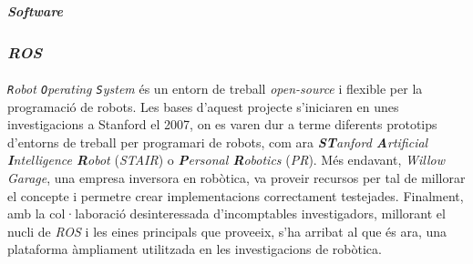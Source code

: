 \documentclass[12pt,a4paper,final,twoside]{article}
\begin{document}



\vspace{20pt}
\textbf{\textit{Software}}
\label{Software}




  


\subsubsection{\textit{ROS}}
\label{ROS}

\paragraph{}\textit{\texttt{R}obot \texttt{O}perating \texttt{S}ystem} \cite{ROS} és un entorn de treball \textit{open-source} i flexible per la programació de robots. Les bases d'aquest projecte s'iniciaren en unes investigacions a Stanford el 2007, on es varen dur a terme diferents prototips d'entorns de treball per programari de robots, com ara \textit{\textbf{ST}anford \textbf{A}rtificial \textbf{I}ntelligence \textbf{R}obot} (\textit{STAIR}) o \textit{\textbf{P}ersonal \textbf{R}obotics} (\textit{PR}). Més endavant, \textit{Willow Garage}, una empresa inversora en robòtica, va proveir recursos per tal de millorar el concepte i permetre crear implementacions correctament testejades. Finalment, amb la col·laboració desinteressada d'incomptables investigadors, millorant el nucli de \textit{ROS} i les eines principals que proveeix, s'ha arribat al que és ara, una plataforma àmpliament utilitzada en les investigacions de robòtica.
\end{document}
